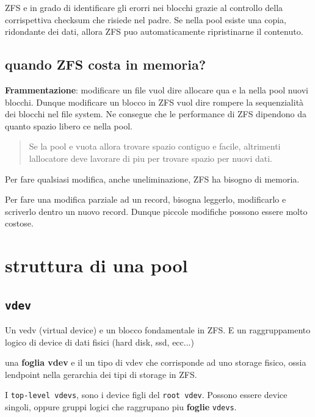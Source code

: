 ZFS e\textquotesingle{} in grado di identificare gli erorri nei blocchi
grazie al controllo della corrispettiva checksum che risiede nel padre.
Se nella pool esiste una copia, ridondante dei dati, allora ZFS
puo\textquotesingle{} automaticamente ripristinarne il contenuto.

\subsection{quando ZFS costa in
memoria?}\label{quando-zfs-costa-in-memoria}

\textbf{Frammentazione}: modificare un file vuol dire allocare qua e la
nella pool nuovi blocchi. Dunque modificare un blocco in ZFS vuol dire
rompere la sequenzialità dei blocchi nel file system. Ne consegue che le
performance di ZFS dipendono da quanto spazio libero
c\textquotesingle e\textquotesingle{} nella pool.

\begin{quote}
Se la pool e\textquotesingle{} vuota allora trovare spazio contiguo
e\textquotesingle{} facile, altrimenti l\textquotesingle allocatore deve
lavorare di piu per trovare spazio per nuovi dati.
\end{quote}

Per fare qualsiasi modifica, anche un\textquotesingle eliminazione, ZFS
ha bisogno di memoria.

Per fare una modifica parziale ad un record, bisogna leggerlo,
modificarlo e scriverlo dentro un nuovo record. Dunque piccole modifiche
possono essere molto costose.

\section{struttura di una pool}\label{struttura-di-una-pool}

\subsection{\texorpdfstring{\texttt{vdev}}{vdev}}\label{vdev}

Un vedv (virtual device) e\textquotesingle{} un blocco fondamentale in
ZFS. E\textquotesingle{} un raggruppamento logico di device di dati
fisici (hard disk, ssd, ecc...)

una \textbf{foglia vdev} e\textquotesingle{} il un tipo di vdev che
corrisponde ad uno storage fisico, ossia l\textquotesingle endpoint
nella gerarchia dei tipi di storage in ZFS.

I \passthrough{\lstinline!top-level vdevs!}, sono i device figli del
\passthrough{\lstinline!root vdev!}. Possono essere device singoli,
oppure gruppi logici che raggrupano piu \textbf{foglie}
\passthrough{\lstinline!vdevs!}.


